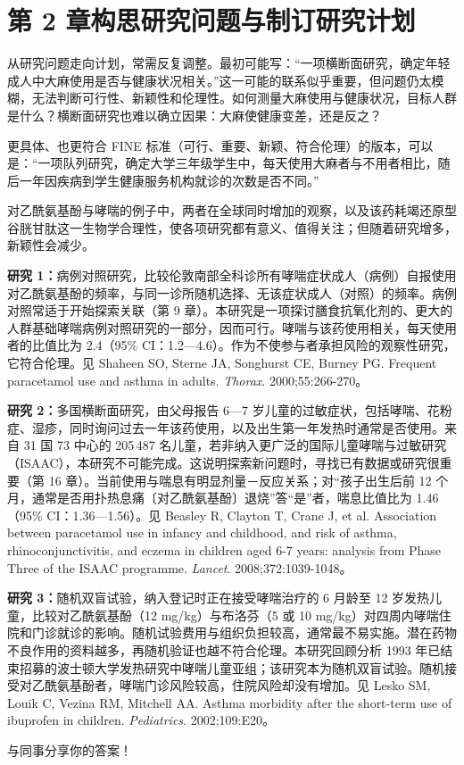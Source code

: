 \section{第 2 章\quad 构思研究问题与制订研究计划}
\begin{answerlist}
\item[1.] 从研究问题走向计划，常需反复调整。最初可能写：“一项横断面研究，确定年轻成人中大麻使用是否与健康状况相关。”这一可能的联系似乎重要，但问题仍太模糊，无法判断可行性、新颖性和伦理性。如何测量大麻使用与健康状况，目标人群是什么？横断面研究也难以确立因果：大麻使健康变差，还是反之？

更具体、也更符合 FINE 标准（可行、重要、新颖、符合伦理）的版本，可以是：“一项队列研究，确定大学三年级学生中，每天使用大麻者与不用者相比，随后一年因疾病到学生健康服务机构就诊的次数是否不同。”
\item[2.] 对乙酰氨基酚与哮喘的例子中，两者在全球同时增加的观察，以及该药耗竭还原型谷胱甘肽这一生物学合理性，使各项研究都有意义、值得关注；但随着研究增多，新颖性会减少。

\textbf{研究 1：}病例对照研究，比较伦敦南部全科诊所有哮喘症状成人（病例）自报使用对乙酰氨基酚的频率，与同一诊所随机选择、无该症状成人（对照）的频率。病例对照常适于开始探索关联（第 9 章）。本研究是一项探讨膳食抗氧化剂的、更大的人群基础哮喘病例对照研究的一部分，因而可行。哮喘与该药使用相关，每天使用者的比值比为 2.4（95\% CI：1.2—4.6）。作为不使参与者承担风险的观察性研究，它符合伦理。见 Shaheen SO, Sterne JA, Songhurst CE, Burney PG. Frequent paracetamol use and asthma in adults. \textit{Thorax}. 2000;55:266-270。

\textbf{研究 2：}多国横断面研究，由父母报告 6—7 岁儿童的过敏症状，包括哮喘、花粉症、湿疹，同时询问过去一年该药使用，以及出生第一年发热时通常是否使用。来自 31 国 73 中心的 205\,487 名儿童，若非纳入更广泛的国际儿童哮喘与过敏研究（ISAAC），本研究不可能完成。这说明探索新问题时，寻找已有数据或研究很重要（第 16 章）。当前使用与喘息有明显剂量－反应关系；对“孩子出生后前 12 个月，通常是否用扑热息痛〔对乙酰氨基酚〕退烧”答“是”者，喘息比值比为 1.46（95\% CI：1.36—1.56）。见 Beasley R, Clayton T, Crane J, et al. Association between paracetamol use in infancy and childhood, and risk of asthma, rhinoconjunctivitis, and eczema in children aged 6-7 years: analysis from Phase Three of the ISAAC programme. \textit{Lancet}. 2008;372:1039-1048。

\textbf{研究 3：}随机双盲试验，纳入登记时正在接受哮喘治疗的 6 月龄至 12 岁发热儿童，比较对乙酰氨基酚（12 mg/kg）与布洛芬（5 或 10 mg/kg）对四周内哮喘住院和门诊就诊的影响。随机试验费用与组织负担较高，通常最不易实施。潜在药物不良作用的资料越多，再随机验证也越不符合伦理。本研究回顾分析 1993 年已结束招募的波士顿大学发热研究中哮喘儿童亚组；该研究本为随机双盲试验。随机接受对乙酰氨基酚者，哮喘门诊风险较高，住院风险却没有增加。见 Lesko SM, Louik C, Vezina RM, Mitchell AA. Asthma morbidity after the short-term use of ibuprofen in children. \textit{Pediatrics}. 2002;109:E20。
\item[3.] 与同事分享你的答案！
\end{answerlist}

